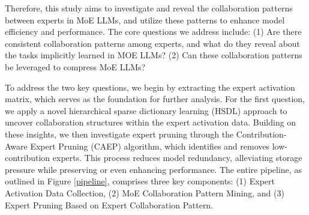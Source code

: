 \documentclass[11pt]{article}
\begin{document}


Therefore, this study aims to investigate and reveal the collaboration patterns between experts in MoE LLMs, and utilize these patterns to enhance model efficiency and performance. The core questions we address include: (1)  Are there consistent collaboration patterns among experts, and what do they reveal about the tasks implicitly learned in MOE LLMs? (2)  Can these collaboration patterns be leveraged to compress MoE LLMs? 


To address the two key questions, we begin by extracting the expert activation matrix, which serves as the foundation for further analysis. For the first question, we apply a novel hierarchical sparse dictionary learning (HSDL) approach to uncover collaboration structures within the expert activation data. Building on these insights, we then investigate expert pruning through the Contribution-Aware Expert Pruning (CAEP) algorithm, which identifies and removes low-contribution experts. This process reduces model redundancy, alleviating storage pressure while preserving or even enhancing performance. The entire pipeline, as outlined in Figure \ref{pipeline}, comprises three key components: (1) Expert Activation Data Collection, (2) MoE Collaboration Pattern Mining, and (3) Expert Pruning Based on Expert Collaboration Pattern.
\end{document}

